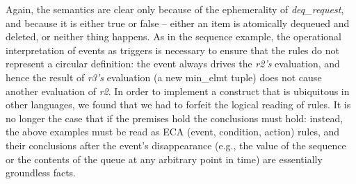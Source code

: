 Again, the semantics are clear only because of the ephemerality of \emph{deq\_request}, and because it is either true or false -- either an item is atomically dequeued and deleted, or neither thing happens.  As in the sequence example, the operational interpretation of events as
triggers is necessary to ensure that the rules do not represent a circular definition: the event 
always drives the \emph{r2's} evaluation, and hence the result of \emph{r3's} evaluation 
(a new min\_elmt tuple) does not cause another evaluation of \emph{r2}.  In order to 
implement a construct that is ubiquitous in other languages, we found that we had to 
forfeit the logical reading of rules.  It is no longer 
the case that if the premises hold the conclusions must hold: instead, the above examples
must be read as ECA (event, condition, action) rules, and their conclusions after the event's 
disappearance (e.g., the value of the sequence or the contents of the queue at any arbitrary 
point in time) are essentially groundless facts.



\begin{comment}
\paa{notes}

  in P2, event relations are implemented as queues, and as such enforced a discipline that 1.) the queue must be the driving or 'delta' relation in any join plan, and 2.) zero or or one tuple are dequeued from the event at a given fixpoint.  in JOL, this was relaxed and events, while true for only one fixpoint, are dequeued in batches, causing bugs in many P2 ports that relied on (2).  the semantic ambiguities persisted, however.

finally, asynchrony.  in the global program we imagine that there is a rule:

\begin{Dedalus}
heartbeat(@Host, Peer, Time) \(\leftarrow\) master(@Peer, Host), timer(@Peer);
\end{Dedalus}

but clearly we cannot read this as logical implication or conclude anything wrt the timing of its arrival at Host.
\end{comment}

